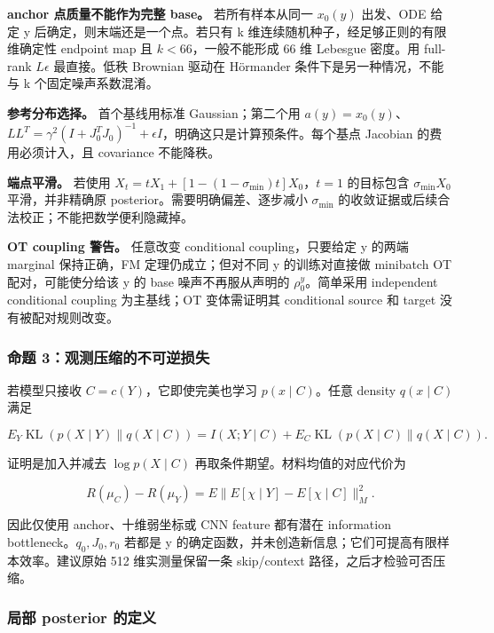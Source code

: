 \documentclass[
  11pt,
  a4paper,
]{article}
\begin{document}
\textbf{anchor 点质量不能作为完整 base。} 若所有样本从同一 \(x_0(y)\)
出发、ODE 给定 y 后确定，则末端还是一个点。若只有 k
维连续随机种子，经足够正则的有限维确定性 endpoint map 且
\(k<66\)，一般不能形成 66 维 Lebesgue 密度。用 full-rank \(L\epsilon\)
最直接。低秩 Brownian 驱动在 Hörmander 条件下是另一种情况，不能与 k
个固定噪声系数混淆。

\textbf{参考分布选择。} 首个基线用标准 Gaussian；第二个用
\(a(y)=x_0(y)\)、\(LL^T=\gamma^2(I+J_0^TJ_0)^{-1}+\epsilon I\)，明确这只是计算预条件。每个基点
Jacobian 的费用必须计入，且 covariance 不能降秩。

\textbf{端点平滑。} 若使用
\(X_t=tX_1+[1-(1-\sigma_{\min})t]X_0\)，\(t=1\) 的目标包含
\(\sigma_{\min}X_0\) 平滑，并非精确原 posterior。需要明确偏差、逐步减小
\(\sigma_{\min}\) 的收敛证据或后续合法校正；不能把数学便利隐藏掉。

\textbf{OT coupling 警告。} 任意改变 conditional coupling，只要给定 y
的两端 marginal 保持正确，FM 定理仍成立；但对不同 y 的训练对直接做
minibatch OT 配对，可能使分给该 y 的 base 噪声不再服从声明的
\(\rho_0^y\)。简单采用 independent conditional coupling 为主基线；OT
变体需证明其 conditional source 和 target 没有被配对规则改变。

\hypertarget{ux547dux9898-3ux89c2ux6d4bux538bux7f29ux7684ux4e0dux53efux9006ux635fux5931}{%
\subsubsection{命题
3：观测压缩的不可逆损失}\label{ux547dux9898-3ux89c2ux6d4bux538bux7f29ux7684ux4e0dux53efux9006ux635fux5931}}

若模型只接收 \(C=c(Y)\)，它即使完美也学习 \(p(x\mid C)\)。任意 density
\(q(x\mid C)\) 满足

\[
E_Y\operatorname{KL}(p(X\mid Y)\|q(X\mid C))
=I(X;Y\mid C)+E_C\operatorname{KL}(p(X\mid C)\|q(X\mid C)).
\]

证明是加入并减去 \(\log p(X\mid C)\) 再取条件期望。材料均值的对应代价为

\[
R(\mu_C)-R(\mu_Y)=E\|E[\chi\mid Y]-E[\chi\mid C]\|_M^2.
\]

因此仅使用 anchor、十维弱坐标或 CNN feature 都有潜在 information
bottleneck。\(q_0,J_0,r_0\) 若都是 y
的确定函数，并未创造新信息；它们可提高有限样本效率。建议原始 512
维实测量保留一条 skip/context 路径，之后才检验可否压缩。

\hypertarget{ux5c40ux90e8-posterior-ux7684ux5b9aux4e49}{%
\subsubsection{局部 posterior
的定义}\label{ux5c40ux90e8-posterior-ux7684ux5b9aux4e49}}
\end{document}

